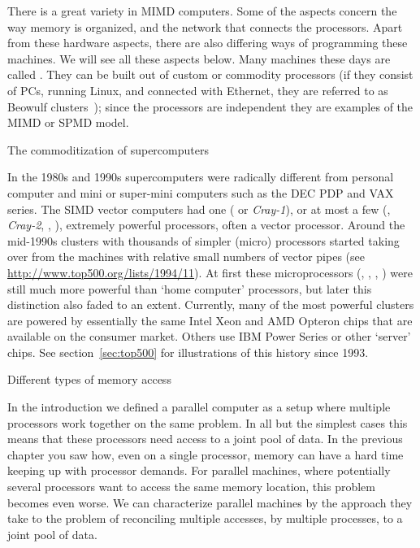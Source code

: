 There is a great variety in \ac{MIMD} computers. Some of the aspects
concern the way memory is organized, and the network that connects the
processors. Apart from these hardware aspects, there are also
differing ways of programming these machines. We will see all these
aspects below. Many machines these days are 
called . They can be built out of custom or
commodity processors (if they consist of PCs, running Linux, and
connected with Ethernet, they are referred to as Beowulf
clusters~\cite{Gropp:BeowulfBook}); since the processors are
independent they are examples of the \ac{MIMD} or \ac{SPMD} model.


 {The commoditization of supercomputers}
\label{sec:commodity}

In the 1980s and 1990s supercomputers were radically different from
personal computer and mini or super-mini computers such as the DEC PDP
and VAX series. The SIMD vector computers had one
( or \emph{Cray-1}), or
at most a few (, \emph{Cray-2},
, ), extremely
powerful processors, often a vector processor. Around the mid-1990s
clusters with thousands of simpler (micro) processors started taking
over from the machines with relative small numbers of vector pipes
(see \url{http://www.top500.org/lists/1994/11}). At first these
microprocessors (,
, ,
) were still much more powerful than `home
computer' processors, but later this distinction also faded to an
extent. Currently, many of the most powerful clusters are powered by
essentially the same Intel Xeon and AMD Opteron chips that are
available on the consumer market. Others use IBM Power Series or other
`server' chips. See section~\ref{sec:top500} for illustrations of
this history since 1993.

 {Different types of memory access}

In the introduction we defined a parallel computer as a setup where
multiple processors work together on the same problem. In all but the
simplest cases this means that these processors need access to a joint
pool of data. In the previous chapter you saw how, even on a single
processor, memory can have a hard time keeping up with processor demands.
For parallel machines, where potentially several processors
want to access the same memory location, this problem becomes even
worse. We can characterize parallel machines by the approach they take
to the problem of reconciling multiple accesses, by multiple
processes, to a joint pool of data.

